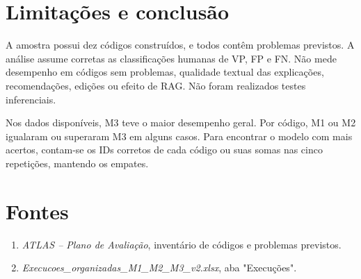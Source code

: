 \documentclass[12pt,a4paper]{article}
\begin{document}
\section{Limitações e conclusão}
A amostra possui dez códigos construídos, e todos contêm problemas previstos. A análise assume corretas as classificações humanas de VP, FP e FN. Não mede desempenho em códigos sem problemas, qualidade textual das explicações, recomendações, edições ou efeito de RAG. Não foram realizados testes inferenciais.

Nos dados disponíveis, M3 teve o maior desempenho geral. Por código, M1 ou M2 igualaram ou superaram M3 em alguns casos. Para encontrar o modelo com mais acertos, contam-se os IDs corretos de cada código ou suas somas nas cinco repetições, mantendo os empates.

\section*{Fontes}
\begin{enumerate}
\item \textit{ATLAS -- Plano de Avaliação}, inventário de códigos e problemas previstos.
\item \textit{Execucoes\_organizadas\_M1\_M2\_M3\_v2.xlsx}, aba "Execuções".
\end{enumerate}
\end{document}
